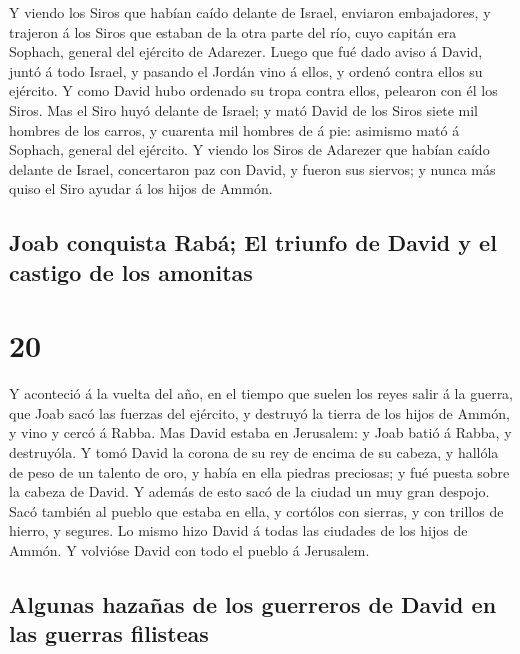  Y viendo los Siros que habían caído delante de Israel,
enviaron embajadores, y trajeron á los Siros que estaban de la otra
parte del río, cuyo capitán era Sophach, general del ejército de
Adarezer.  Luego que fué dado aviso á David, juntó á todo
Israel, y pasando el Jordán vino á ellos, y ordenó contra ellos su
ejército. Y como David hubo ordenado su tropa contra ellos, pelearon con
él los Siros.  Mas el Siro huyó delante de Israel; y mató
David de los Siros siete mil hombres de los carros, y cuarenta mil
hombres de á pie: asimismo mató á Sophach, general del ejército.
 Y viendo los Siros de Adarezer que habían caído delante de
Israel, concertaron paz con David, y fueron sus siervos; y nunca más
quiso el Siro ayudar á los hijos de Ammón.

\hypertarget{joab-conquista-rabuxe1-el-triunfo-de-david-y-el-castigo-de-los-amonitas}{%
\subsection{Joab conquista Rabá; El triunfo de David y el castigo de los
amonitas}\label{joab-conquista-rabuxe1-el-triunfo-de-david-y-el-castigo-de-los-amonitas}}

\hypertarget{section-19}{%
\section{20}\label{section-19}}

 Y aconteció á la vuelta del año, en el tiempo que suelen
los reyes salir á la guerra, que Joab sacó las fuerzas del ejército, y
destruyó la tierra de los hijos de Ammón, y vino y cercó á Rabba. Mas
David estaba en Jerusalem: y Joab batió á Rabba, y destruyóla.
 Y tomó David la corona de su rey de encima de su cabeza, y
hallóla de peso de un talento de oro, y había en ella piedras preciosas;
y fué puesta sobre la cabeza de David. Y además de esto sacó de la
ciudad un muy gran despojo.  Sacó también al pueblo que
estaba en ella, y cortólos con sierras, y con trillos de hierro, y
segures. Lo mismo hizo David á todas las ciudades de los hijos de Ammón.
Y volvióse David con todo el pueblo á Jerusalem.

\hypertarget{algunas-hazauxf1as-de-los-guerreros-de-david-en-las-guerras-filisteas}{%
\subsection{Algunas hazañas de los guerreros de David en las guerras
filisteas}\label{algunas-hazauxf1as-de-los-guerreros-de-david-en-las-guerras-filisteas}}

